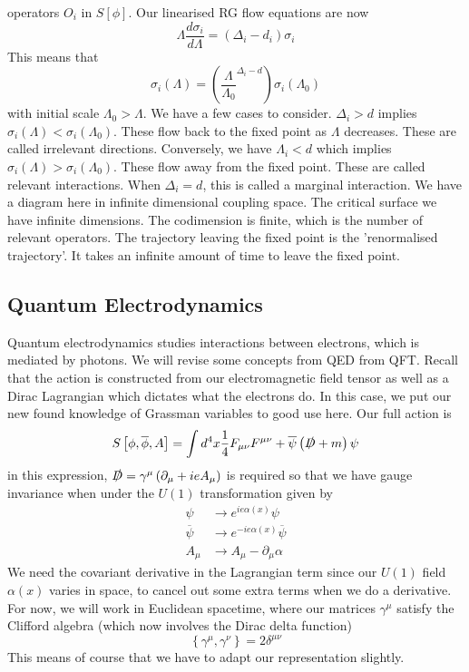\documentclass[11pt, oneside]{article}   	%
\theoremstyle{slanted}
\begin{document}
operators $ O _ i $ in $ S \left[  \phi  \right]   $. 
Our linearised RG flow equations are now 
\[
\Lambda \frac{d \sigma _ i }{ d \Lambda }  = \left( 
\Delta _ i - d _ i \right)  \sigma _ i 	 
\] This means 
that 
\[
\sigma _ i \left( \Lambda  \right)  
= \left( \frac{\Lambda }{ \Lambda _0  }^{ \Delta _ i - d }   \right)  \sigma _ i 
\left( \Lambda _ 0  \right)  
\] with initial scale $ \Lambda _ 0 > \Lambda $. 
We have a few cases to consider. 
$ \Delta _ i > d $ implies $ \sigma _i \left( \Lambda  \right)  < \sigma _ i 
\left( \Lambda _ 0  \right)  $. These flow back to the 
fixed point as $ \Lambda $ decreases. These are called 
irrelevant directions. 
Conversely, we have 
$ \Lambda _ i < d $ which implies $ \sigma _ i \left( \Lambda  \right)  > 
\sigma  _ i \left( \Lambda _ 0  \right)   $. 
These flow away from the fixed point. 
These are called relevant interactions. 
When $ \Delta _ i  = d  $, this is 
called a marginal interaction. 
We have a diagram here in infinite dimensional 
coupling space. The critical surface 
we have infinite dimensions. 
The codimension is finite, 
which is the number of relevant operators. 
The trajectory leaving the 
fixed point is the 'renormalised trajectory'. 
It takes an infinite amount of time to leave the fixed point. 

\subsection{Quantum Electrodynamics}
Quantum electrodynamics 
studies interactions between electrons, which 
is mediated by photons. 
We will revise some concepts from QED from QFT. 
Recall that the action is 
constructed from our electromagnetic field tensor as 
well as a Dirac Lagrangian which dictates what the 
electrons do. 
In this case, we put our new found knowledge of Grassman variables to 
good use here. 
Our full action is 
\[
S\left[ \phi , \overline{ \phi } , A  \right]  = 
\int d ^ 4 x \frac{1}{4 } F _{ \mu \nu } F ^{ \mu \nu } + \overline{ \psi } \left( 
\slashed{D} + m 	 \right) \psi 
\]  in this expression, $ \slashed{D} = \gamma ^ \mu \left( 
\partial  _ \mu + i e A _ \mu \right)  $ is 
required so that we have gauge invariance when 
under the $ U \left(  1  \right)  $ transformation given by 
\begin{align*}
\psi & \to e ^{ i e \alpha \left( x  \right)  } \psi \\
\overline{ \psi} & \to e ^{ - i e \alpha \left(  x  \right)  } \overline{\psi } \\
A _ \mu & \to A _ \mu  - \partial  _ \mu \alpha 
\end{align*} 
We need the covariant derivative in 
the Lagrangian term since our $ U \left(  1  \right)  $ field 
$ \alpha\left(  x  \right)  $ varies in space, to cancel out 
some extra terms when we do a derivative. 
For now, we will work in 
Euclidean spacetime, where our matrices $ \gamma ^ \mu $ 
satisfy the Clifford algebra (which now involves the Dirac 
delta function)
\[
\left\{ \gamma ^ \mu , \gamma ^ \nu  \right\}   = 2 \delta ^{ \mu \nu } 
\] This means of course that we 
have to adapt our representation slightly. 
\end{document}
